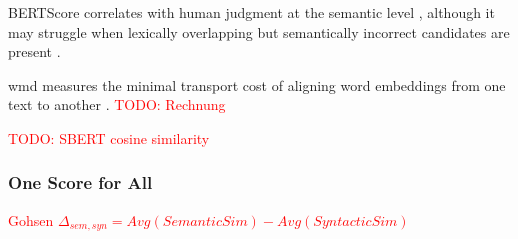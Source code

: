 

BERTScore correlates with human judgment at the semantic level \citep{kurt_pehlivanoglu_comparative_2024}, although it may struggle when lexically overlapping but semantically incorrect candidates are present \citep{hanna_fine_grained_2021}.

\ac{wmd} measures the minimal transport cost of aligning word embeddings from one text to another \citep{gohsen_captions_2023}. 
\textcolor{red}{TODO: Rechnung}

\textcolor{red}{TODO: SBERT cosine similarity}


\subsubsection{One Score for All}

\textcolor{red}{Gohsen $\Delta_{sem,syn}=Avg(Semantic Sim)-Avg(Syntactic Sim)$~\citep{gohsen_captions_2023}}
